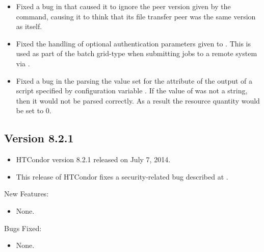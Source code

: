 \begin{itemize}
\item Fixed a bug in  that caused it to ignore the peer
version given by the  command, causing it to think that
its file transfer peer was the same version as itself.

\item Fixed the handling of optional authentication parameters given to
. This is used as part of the batch grid-type when
submitting jobs to a remote system via .

\item  Fixed a bug in the parsing the value set for the
 attribute of the output of a script specified by
configuration variable .
If the value of  was not a string, 
then it would not be parsed correctly. 
As a result the resource quantity would be set to 0.

\end{itemize}

\subsection*{\label{sec:New-8-2-1}Version 8.2.1}

\begin{itemize}
\item HTCondor version 8.2.1 released on July 7, 2014.

\item \Security
This release of HTCondor fixes a security-related bug described at 
.

\end{itemize}

\noindent New Features:

\begin{itemize}

\item None.

\end{itemize}

\noindent Bugs Fixed:

\begin{itemize}

\item None.

\end{itemize}

